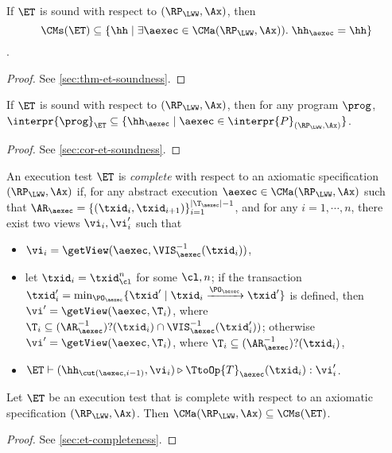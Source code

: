 \begin{theorem}
\label{thm:et_soundness}
If $\ET$ is sound with respect to $(\RP_{\LWW}, \Ax)$, then 
\[
    \CMs(\ET) \subseteq \{ \hh \mid \exists \aexec \in \CMa(\RP_{\LWW}, \Ax)).\;\hh_{\aexec} = \hh\}
\].
\end{theorem}
\begin{proof}
    See \cref{sec:thm-et-soundness}.
\end{proof}

\begin{corollary}
\label{cor:et-soundness}
If $\ET$ is sound with respect to $(\RP_{\LWW}, \Ax)$, then 
for any program $\prog$, $\interpr{\prog}_{\ET} \subseteq \{ \hh_{\aexec} \mid \aexec \in \interpr{P}_{(\RP_{\LWW}, \Ax)} \}$.
\end{corollary}
\begin{proof}
See \cref{sec:cor-et-soundness}.
\end{proof}

\begin{definition}
\label{def:et_complete}
An execution test $\ET$ is \emph{complete} with respect 
to an axiomatic specification $(\RP_{\LWW}, \Ax)$ if, for any 
abstract execution $\aexec \in \CMa(\RP_{\LWW}, \Ax)$ 
such that $\AR_{\aexec} = \{(\txid_{i}, \txid_{i+1})\}_{i=1}^{\lvert \T_{\aexec} \rvert - 1}$, 
and for any $i=1,\cdots, n$, there exist two views $\vi_{i}, \vi_{i}'$ such that 
\begin{itemize}
\item $\vi_{i} = \getView(\aexec, \VIS_{\aexec}^{-1}(\txid_{i}))$, 
\item let $\txid_{i} = \txid_{\cl}^{n}$ for some $\cl, n$; if the
transaction $\txid_{i}' = \min_{\PO_{\aexec}}\{\txid' \mid \txid_i \xrightarrow{\PO_{\aexec}} \txid'\}$  
is defined, then $\vi' = \getView(\aexec, \T_{i})$, where $\T_{i} \subseteq (\AR_{\aexec}^{-1})?(\txid_{i}) \cap \VIS_{\aexec}^{-1}(\txid_{i}'))$; 
otherwise $\vi' = \getView(\aexec, \T_{i})$, where $\T_{i} \subseteq (\AR_{\aexec}^{-1})?(\txid_{i})$, 
\item $\ET \vdash (\hh_{\cut(\aexec, i-1)}, \vi_{i}) \triangleright \TtoOp{T}_{\aexec}(\txid_{i}) : \vi_{i}'$.
\end{itemize}
\end{definition}

\begin{theorem}
\label{thm:et_complete}
Let $\ET$ be an execution test that is complete with respect to 
an axiomatic specification $(\RP_{\LWW}, \Ax)$. Then 
$\CMa(\RP_{\LWW}, \Ax) \subseteq \CMs(\ET)$.
\end{theorem}
\begin{proof}
See \cref{sec:et-completeness}.
\end{proof}


